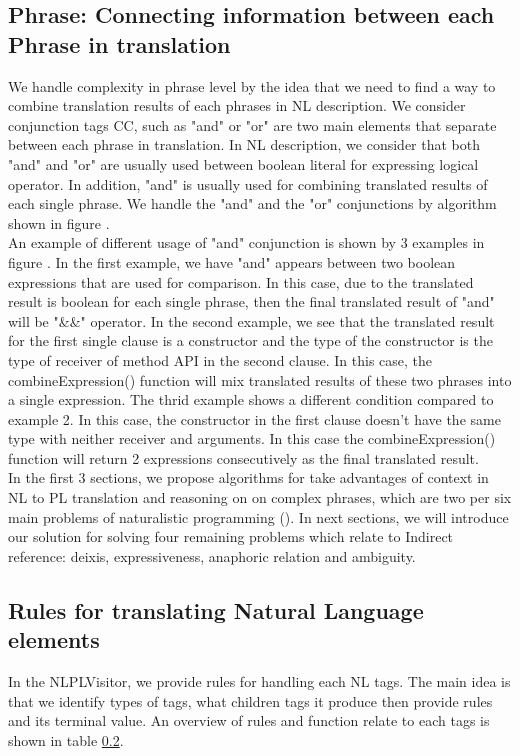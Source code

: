 \subsection{Phrase: Connecting information between each Phrase in translation}
We handle complexity in phrase level by the idea that we need to find a way to combine translation results of each phrases in NL description. We consider conjunction tags CC, such as "and" or "or" are two main elements that separate between each phrase in translation.  In NL description, we consider that both "and" and "or" are usually used between boolean literal for expressing logical operator. In addition, "and" is usually used for combining translated results of each single phrase. We handle the "and" and the "or" conjunctions by algorithm shown in figure \cite{}. \\
An example of different usage of "and" conjunction is shown by 3 examples in figure \cite{}. In the first example, we have "and" appears between two  boolean expressions that are used for comparison. In this case, due to the translated result is boolean for each single phrase, then the final translated result of "and" will be "\&\&" operator. In the second example, we see that the translated result for the first single clause is a constructor and the type of the constructor is the type of receiver of method API in the second clause. In this case, the combineExpression() function will mix translated results of these two phrases into a single expression. The thrid example shows a different condition compared to example 2. In this case, the constructor in the first clause doesn't have the same type with neither receiver and arguments. In this case the combineExpression() function will return 2 expressions consecutively as the final translated result.  \\
In the first 3 sections, we propose algorithms for take advantages of context in NL to PL translation and reasoning on on complex phrases, which are two per six main problems of naturalistic programming (\cite{}). In next sections, we will introduce our solution for solving four remaining problems which relate to Indirect reference: deixis, expressiveness, anaphoric relation and ambiguity.
\subsection{Rules for translating Natural Language elements}
In the NLPLVisitor, we provide rules for handling each NL tags. The main idea is that we identify types of tags, what children tags it produce then provide rules and its terminal value. An overview of rules and function relate to each tags is shown in table \ref{}.

